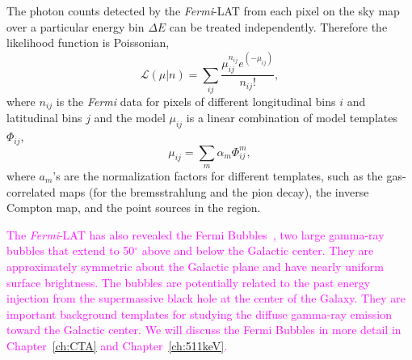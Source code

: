 \documentclass[doublespace,nopageskip]{VTthesis} %
\newcommand{\DS}[1]{\textcolor{magenta}{#1}}
\begin{document}
The photon counts detected by the \textit{Fermi}-LAT from each pixel on the sky map over a particular energy bin $\Delta E$ can be treated independently. Therefore the likelihood function is Poissonian,
\begin{equation}
    \mathcal{L}(\mu|n)= \sum_{ij}\frac{\mu_{ij}^{n_{ij}}e^{(-\mu_{ij})}}{n_{ij}!},
\end{equation}
where $n_{ij}$ is the \textit{Fermi} data for pixels of different longitudinal bins $i$ and latitudinal bins $j$ and the model $\mu_{ij}$ is a linear combination of model templates $\Phi_{ij}$,
\begin{equation}
    \mu_{ij} = \sum_m \alpha_m \Phi^m_{ij},
\end{equation}
where $a_m$'s are the normalization factors for different templates, such as the gas-correlated maps (for the bremsstrahlung and the pion decay), the inverse Compton map, and the point sources in the region.

\DS{The \textit{Fermi}-LAT has also revealed the Fermi Bubbles~\cite{2010ApJ...724.1044S}, two large gamma-ray bubbles that extend to 50$^\circ$ above and below the Galactic center. They are approximately symmetric about the Galactic plane and have nearly uniform surface brightness. The bubbles are potentially related to the past energy injection from the supermassive black hole at the center of the Galaxy. They are important background templates for studying the diffuse gamma-ray emission toward the Galactic center. We will discuss the Fermi Bubbles in more detail in Chapter~\ref{ch:CTA} and Chapter~\ref{ch:511keV}.   }
\end{document}
